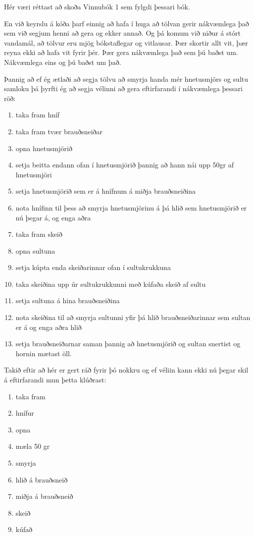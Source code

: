 Hér væri réttast að skoða Vinnubók 1 sem fylgdi þessari bók. 

En við keyrslu á kóða þarf einnig að hafa í huga að tölvan gerir nákvæmlega það sem við segjum henni að gera og ekker annað.
Og þá komum við niður á stórt vandamál, að tölvur eru mjög bókstaflegar og vitlausar.
Þær skortir allt vit, þær reyna ekki að hafa vit fyrir þér. 
Þær gera nákvæmlega það sem þú baðst um.
Nákvæmlega eins og þú baðst um það.

Þannig að ef ég ætlaði að segja tölvu að smyrja handa mér hnetusmjörs og sultu samloku þá þyrfti ég að segja vélinni að gera eftirfarandi í nákvæmlega þessari röð:
\vspace{0.4cm}
\begin{enumerate}
	\item taka fram hníf
	\item taka fram tvær brauðsneiðar
	\item opna hnetusmjörið
	\item setja beitta endann ofan í hnetusmjörið þannig að hann nái upp 50gr af hnetusmjöri
	\item setja hnetusmjörið sem er á hnífnum á miðja brauðsneiðina
	\item nota hnífinn til þess að smyrja hnetusmjörinu á þá hlið sem hnetusmjörið er nú þegar á, og enga aðra
	\item taka fram skeið
	\item opna sultuna
	\item setja kúpta enda skeiðarinnar ofan í sultukrukkuna 
	\item taka skeiðina upp úr sultukrukkunni með kúfaða skeið af sultu
	\item setja sultuna á hina brauðsneiðina
	\item nota skeiðina til að smyrja sultunni yfir þá hlið brauðsneiðarinnar sem sultan er á og enga aðra hlið
	\item  setja brauðsneiðarnar saman þannig að hnetusmjörið og sultan snertist og hornin mætast öll. 
\end{enumerate} 
\vspace{0.4cm}
Takið eftir að hér er gert ráð fyrir þó nokkru og ef véliin kann ekki nú þegar skil á eftirfarandi mun þetta klúðrast: 
\vspace{0.2cm}
\begin{enumerate}
	\item taka fram
	\item hnífur
	\item opna
	\item mæla 50 gr
	\item smyrja
	\item hlið á brauðsneið
	\item miðja á brauðsneið
	\item skeið
	\item kúfað
\end{enumerate} 
\vspace{0.2cm}

